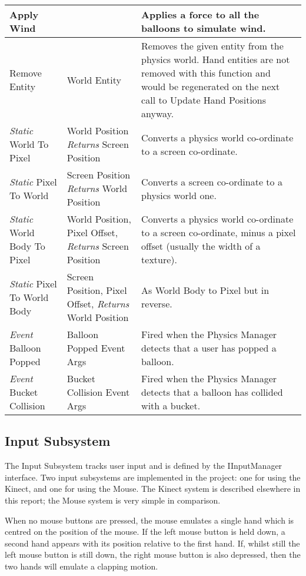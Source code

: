 \begin{table}[H]
\begin{tabular}{|p{5cm}|p{3cm}|p{10cm}|}
Apply Wind & & 
Applies a force to all the balloons to simulate wind. \\ \hline

Remove Entity & World Entity &
Removes the given entity from the physics world. Hand entities are not removed
with this function and would be regenerated on the next call to Update Hand 
Positions anyway. \\ \hline

\emph{Static} World To Pixel & World Position \emph{Returns} Screen Position &
Converts a physics world co-ordinate to a screen co-ordinate.\\ \hline

\emph{Static} Pixel To World & Screen Position \emph{Returns} World Position &
Converts a screen co-ordinate to a physics world one.\\ \hline

\emph{Static} World Body To Pixel & World Position, Pixel Offset, 
\emph{Returns} Screen Position &
Converts a physics world co-ordinate to a screen co-ordinate, minus a pixel 
offset (usually the width of a texture).\\ \hline

\emph{Static} Pixel To World Body & Screen Position, Pixel Offset, 
\emph{Returns} World Position & 
As World Body to Pixel but in reverse.\\ \hline

\emph{Event} Balloon Popped & Balloon Popped Event Args &
Fired when the Physics Manager detects that a user has popped a balloon.
\\ \hline

\emph{Event} Bucket Collision & Bucket Collision Event Args & 
Fired when the Physics Manager detects that a balloon has collided with a 
bucket.\\ \hline
\end{tabular}
\end{table}

\subsection{Input Subsystem}
The Input Subsystem tracks user input and is defined by the IInputManager
interface. Two input subsystems are implemented in the project: one for using
the Kinect, and one for using the Mouse. The Kinect system is described 
elsewhere in this report; the Mouse system is very simple in comparison.
 
When no mouse buttons are pressed, the mouse emulates a single hand which is
centred on the position of the mouse. If the left mouse button is held down, a
second hand appears with its position relative to the first hand. If, whilst
still the left mouse button is still down, the right mouse button is also
depressed, then the two hands will emulate a clapping motion.

